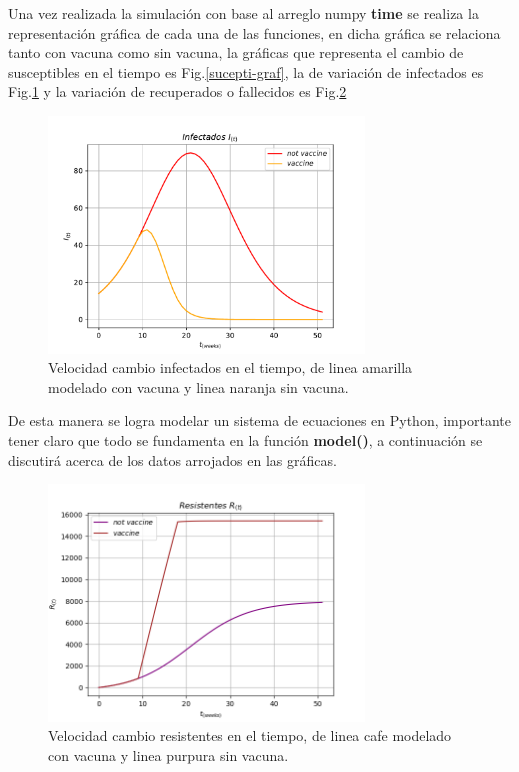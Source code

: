 Una vez realizada la simulación con base al arreglo numpy \textbf{time} se realiza la representación gráfica de cada una de las funciones, en dicha gráfica se relaciona tanto con vacuna como sin vacuna, la gráficas que representa el cambio de susceptibles en el tiempo es Fig.\ref{sucepti-graf}, la de variación de infectados es Fig.\ref{infectad-graf} y la variación de recuperados o fallecidos es Fig.\ref{resis-graf}



\begin{figure}[h]
  \begin{center}
  \includegraphics[width=3.3in]{pdf/infectados.pdf}
  \caption{Velocidad cambio infectados en el tiempo, de linea amarilla modelado con vacuna y linea naranja sin vacuna. }\label{infectad-graf}
  \end{center}
\end{figure}

De esta manera se logra modelar un sistema de ecuaciones en Python, importante tener claro que todo se fundamenta en la función \textbf{model()}, a continuación se discutirá acerca de los datos arrojados en las gráficas.

\begin{figure}[h]
  \begin{center}
  \includegraphics[width=3.3in]{photo/resistentes.png}
  \caption{Velocidad cambio resistentes en el tiempo, de linea cafe modelado con vacuna y linea purpura sin vacuna. }\label{resis-graf}
  \end{center}
\end{figure}

